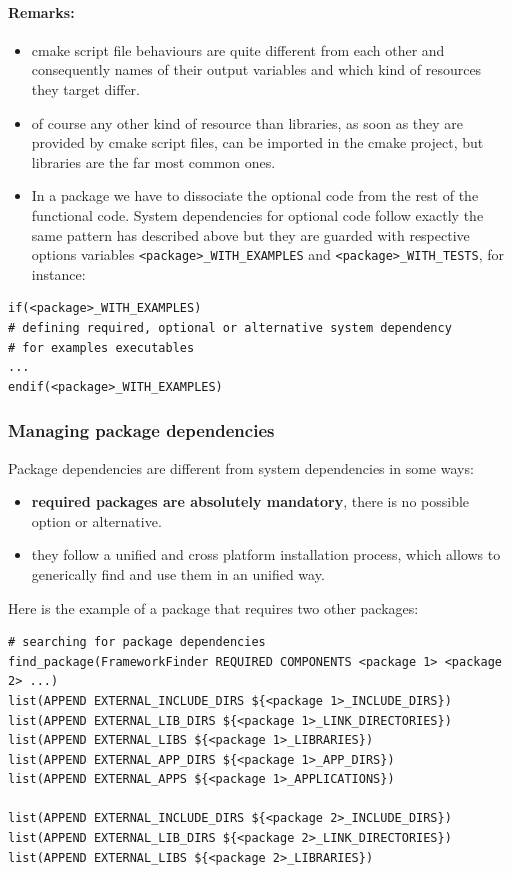 \documentclass[12pt,a4paper]{article}
\begin{document}
\paragraph{Remarks:}
\begin{itemize}
\item cmake script file behaviours are quite different from each other and consequently names of their output variables and which kind of resources they target differ.
\item of course any other kind of resource than libraries, as soon as they are provided by cmake script files, can be imported in the cmake project, but libraries are the far most common ones.
\item In a package we have to dissociate the optional code from the rest of the functional code. System dependencies for optional code follow exactly the same pattern has described above but they are guarded with respective options variables \texttt{<package>\_WITH\_EXAMPLES} and \texttt{<package>\_WITH\_TESTS}, for instance:
\end{itemize}

\begin{verbatim}
if(<package>_WITH_EXAMPLES)
# defining required, optional or alternative system dependency
# for examples executables
...
endif(<package>_WITH_EXAMPLES)
\end{verbatim}

\subsubsection{Managing package dependencies}

Package dependencies are different from system dependencies in some ways:
\begin{itemize}
\item \textbf{required packages are absolutely mandatory}, there is no possible option or alternative. 
\item they follow a unified and cross platform installation process, which allows to generically find and use them in an unified way.
\end{itemize} 

Here is the example of a package that requires two other packages:
\begin{verbatim}
# searching for package dependencies
find_package(FrameworkFinder REQUIRED COMPONENTS <package 1> <package 2> ...)
list(APPEND EXTERNAL_INCLUDE_DIRS ${<package 1>_INCLUDE_DIRS})
list(APPEND EXTERNAL_LIB_DIRS ${<package 1>_LINK_DIRECTORIES})
list(APPEND EXTERNAL_LIBS ${<package 1>_LIBRARIES})
list(APPEND EXTERNAL_APP_DIRS ${<package 1>_APP_DIRS})
list(APPEND EXTERNAL_APPS ${<package 1>_APPLICATIONS})

list(APPEND EXTERNAL_INCLUDE_DIRS ${<package 2>_INCLUDE_DIRS})
list(APPEND EXTERNAL_LIB_DIRS ${<package 2>_LINK_DIRECTORIES})
list(APPEND EXTERNAL_LIBS ${<package 2>_LIBRARIES})
\end{verbatim}
\end{document}

